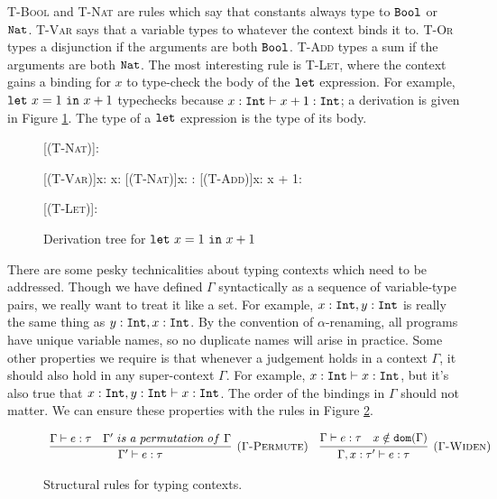 \textsc{T-Bool} and \textsc{T-Nat} are rules which say that constants always type to $\mathtt{Bool}$ or $\mathtt{Nat}$. \textsc{T-Var} says that a variable types to whatever the context binds it to. \textsc{T-Or} types a disjunction if the arguments are both $\mathtt{Bool}$. \textsc{T-Add} types a sum if the arguments are both $\mathtt{Nat}$. The most interesting rule is \textsc{T-Let}, where the context gains a binding for $x$ to type-check the body of the $\mathtt{let}$ expression. For example, $\mathtt{let}~ x = 1~\mathtt{in}~ x+1$ typechecks because $x:\mathtt{Int} \vdash x + 1: \mathtt{Int}$; a derivation is given in Figure \ref{fig:ebl_let_tree}. The type of a $\mathtt{let}$ expression is the type of its body.

\begin{figure}[h]


    \begin{prooftree*}
        [\textsc{(T-Nat)}]{: \Nat}
        
        [\textsc{(T-Var)}]{x: \Int \vdash x: \Int}
        [\textsc{(T-Nat)}]{x: \Int {}: \Int }
        [\textsc{(T-Add)}]{x: \Int \vdash x + 1: \Int}
        
        [\textsc{(T-Let)}]{\vdash {}: \Int}
        
 	\end{prooftree*}
 	
\vspace{-12pt}
\caption{Derivation tree for $\mathtt{let}~ x = 1~\mathtt{in}~ x+1$}
\label{fig:ebl_let_tree}
\end{figure}
 
There are some pesky technicalities about typing contexts which need to be addressed. Though we have defined $\Gamma$ syntactically as a sequence of variable-type pairs, we really want to treat it like a set. For example, $x: \mathtt{Int}, y: \mathtt{Int}$ is really the same thing as $y: \mathtt{Int}, x: \mathtt{Int}$. By the convention of $\alpha$-renaming, all programs have unique variable names, so no duplicate names will arise in practice. Some other properties we require is that whenever a judgement holds in a context $\Gamma$, it should also hold in any super-context $\Gamma$. For example, $x:\mathtt{Int} \vdash x:\mathtt{Int}$, but it's also true that $x:\mathtt{Int}, y:\mathtt{Int} \vdash x:\mathtt{Int}$. The order of the bindings in $\Gamma$ should not matter. We can ensure these properties with the rules in Figure \ref{fig:ctx_rules}.

\begin{figure}[h]

\noindent
{}

\[
\begin{array}{c}

\infer[\textsc{($\Gamma$-Permute)}]
	{\Gamma' \vdash e: \tau}
	{\Gamma \vdash e: \tau & \Gamma'~is~a~permutation~of~\Gamma}
	~~~
\infer[\textsc{($\Gamma$-Widen)}]
	{\Gamma, x: \tau' \vdash e: \tau }
	{\Gamma \vdash e: \tau & x \notin \kwa{dom}(\Gamma)}

	
\end{array}
\]

\vspace{-12pt}
\caption{Structural rules for typing contexts.}
\label{fig:ctx_rules}
\end{figure}

